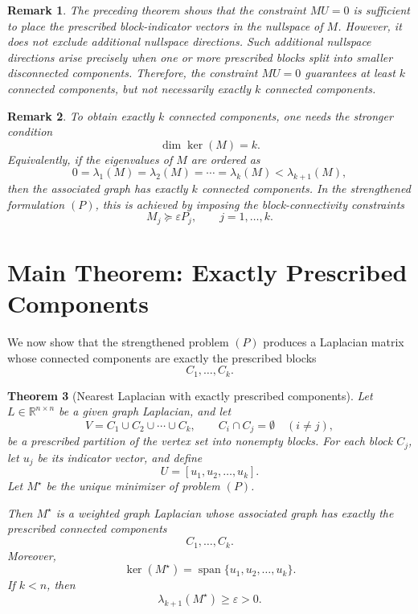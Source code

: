\documentclass[11pt]{article}
\newtheorem{theorem}{Theorem}[section]
\newtheorem{remark}[theorem]{Remark}
\begin{document}
	\begin{remark}
	The preceding theorem shows that the constraint $MU=0$ is sufficient to place the prescribed block-indicator vectors in the nullspace of $M$. However, it does not exclude additional nullspace directions. Such additional nullspace directions arise precisely when one or more prescribed blocks split into smaller disconnected components. Therefore, the constraint $MU=0$ guarantees at least $k$ connected components, but not necessarily exactly $k$ connected components.
	\end{remark}
	
	\begin{remark}
	To obtain exactly $k$ connected components, one needs the stronger condition
	\[
	\dim\ker(M)=k.
	\]
	Equivalently, if the eigenvalues of $M$ are ordered as
	\[
	0=\lambda_1(M)=\lambda_2(M)=\cdots=\lambda_k(M)<\lambda_{k+1}(M),
	\]
	then the associated graph has exactly $k$ connected components. In the strengthened formulation $(P)$, this is achieved by imposing the block-connectivity constraints
	\[
	M_j\succeq \varepsilon P_j,\qquad j=1,\ldots,k.
	\]
	\end{remark}

	
	
\section{Main Theorem: Exactly Prescribed Components}

We now show that the strengthened problem $(P)$ produces a Laplacian matrix whose connected components are exactly the prescribed blocks
\[
C_1,\ldots,C_k.
\]

\begin{theorem}[Nearest Laplacian with exactly prescribed components]
	Let $L\in\mathbb R^{n\times n}$ be a given graph Laplacian, and let
	\[
	V=C_1\cup C_2\cup\cdots\cup C_k,
	\qquad
	C_i\cap C_j=\emptyset\quad (i\ne j),
	\]
	be a prescribed partition of the vertex set into nonempty blocks. For each block $C_j$, let $u_j$ be its indicator vector, and define
	\[
	U=[u_1,u_2,\ldots,u_k].
	\]
	Let $M^\star$ be the unique minimizer of problem $(P)$.
	
	Then $M^\star$ is a weighted graph Laplacian whose associated graph has exactly the prescribed connected components
	\[
	C_1,\ldots,C_k.
	\]
	Moreover,
	\[
	\ker(M^\star)=\operatorname{span}\{u_1,u_2,\ldots,u_k\}.
	\]
	If $k<n$, then
	\[
	\lambda_{k+1}(M^\star)\ge \varepsilon>0.
	\]
\end{theorem}
\end{document}

